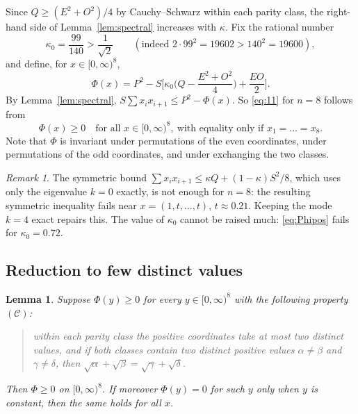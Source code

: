 \documentclass[11pt]{article}
\newtheorem{lemma}[theorem]{Lemma}
\theoremstyle{remark}
\newtheorem{remark}[theorem]{Remark}
\numberwithin{equation}{section}
\begin{document}
Since $Q\ge(E^2+O^2)/4$ by Cauchy--Schwarz within each parity class, the right-hand side of
Lemma~\ref{lem:spectral} increases with $\kappa$. Fix the rational number
\[
\kappa_0=\frac{99}{140}>\frac1{\sqrt2}\qquad(\text{indeed }2\cdot99^2=19602>140^2=19600),
\]
and define, for $x\in[0,\infty)^8$,
\begin{equation}\label{eq:Phi}
\Phi(x)=P^2-S\Big[\kappa_0\Big(Q-\frac{E^2+O^2}{4}\Big)+\frac{EO}{2}\Big].
\end{equation}
By Lemma~\ref{lem:spectral}, $S\sum x_ix_{i+1}\le P^2-\Phi(x)$. So \eqref{eq:11} for $n=8$
follows from
\begin{equation}\label{eq:Phipos}
\Phi(x)\ge0\quad\text{for all }x\in[0,\infty)^8,\ \text{with equality only if }x_1=\dots=x_8 .
\end{equation}
Note that $\Phi$ is invariant under permutations of the even coordinates, under permutations of
the odd coordinates, and under exchanging the two classes.

\begin{remark}
The symmetric bound $\sum x_ix_{i+1}\le\kappa Q+(1-\kappa)S^2/8$, which uses only the
eigenvalue $k=0$ exactly, is not enough for $n=8$: the resulting symmetric inequality fails near
$x=(1,t,\dots,t)$, $t\approx0.21$. Keeping the mode $k=4$ exact repairs this. The value of
$\kappa_0$ cannot be raised much: \eqref{eq:Phipos} fails for $\kappa_0=0.72$.
\end{remark}

\subsection{Reduction to few distinct values}

\begin{lemma}\label{lem:lagrange}
Suppose $\Phi(y)\ge0$ for every $y\in[0,\infty)^8$ with the following property $(\mathcal C)$:
\begin{quote}
within each parity class the positive coordinates take at most two distinct values, and if
both classes contain two distinct positive values $\alpha\ne\beta$ and $\gamma\ne\delta$, then
$\sqrt\alpha+\sqrt\beta=\sqrt\gamma+\sqrt\delta$.
\end{quote}
Then $\Phi\ge0$ on $[0,\infty)^8$. If moreover $\Phi(y)=0$ for such $y$ only when $y$ is constant,
then the same holds for all $x$.
\end{lemma}
\end{document}
